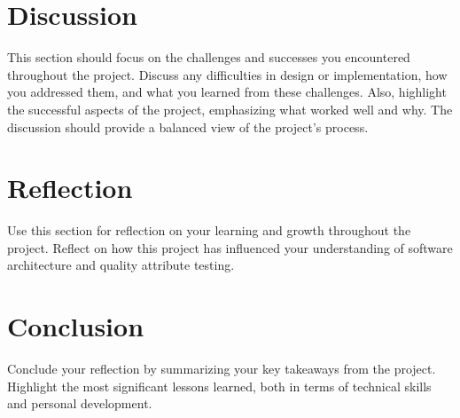 \documentclass[conference, onecolumn]{IEEEtran}
\begin{document}
\section{Discussion}
This section should focus on the challenges and successes you encountered throughout the project.
Discuss any difficulties in design or implementation, how you addressed them, and what you learned from these challenges.
Also, highlight the successful aspects of the project, emphasizing what worked well and why.
The discussion should provide a balanced view of the project's process.

\section{Reflection}
Use this section for reflection on your learning and growth throughout the project.
Reflect on how this project has influenced your understanding of software architecture and quality attribute testing.

\section{Conclusion}
Conclude your reflection by summarizing your key takeaways from the project.
Highlight the most significant lessons learned, both in terms of technical skills and personal development.




\vspace{12pt}
\end{document}
